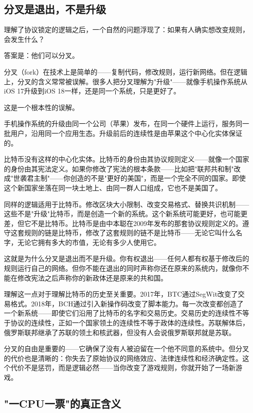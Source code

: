 \documentclass[a4paper,12pt,openany]{ctexbook}
\begin{document}
\subsection*{分叉是退出，不是升级}


理解了协议锁定的逻辑之后，一个自然的问题浮现了：如果有人确实想改变规则，会发生什么？

答案是：他们可以分叉。

分叉（fork）在技术上是简单的——复制代码，修改规则，运行新网络。但在逻辑上，分叉的含义常常被误解。很多人把分叉理解为"升级"——就像手机操作系统从iOS 17升级到iOS 18一样，还是同一个系统，只是更好了。

这是一个根本性的误解。

手机操作系统的升级由同一个公司（苹果）发布，在同一个硬件上运行，服务同一批用户，沿用同一个应用生态。升级前后的连续性是由苹果这个中心化实体保证的。

比特币没有这样的中心化实体。比特币的身份由其协议规则定义——就像一个国家的身份由其宪法定义。如果你修改了宪法的根本条款——比如把"联邦共和制"改成"世袭君主制"——你创造的不是"更好的美国"，而是一个完全不同的国家。即使这个新国家坐落在同一块土地上、由同一群人口组成，它也不是美国了。

同样的逻辑适用于比特币。修改区块大小限制、改变交易格式、替换共识机制——这些不是"升级"比特币，而是创造一个新的系统。这个新系统可能更好，也可能更差，但它不是比特币。比特币是由中本聪在2009年发布的那套协议规则定义的。遵守这套规则的链是比特币，修改了这套规则的链不是比特币——无论它叫什么名字，无论它拥有多大的市值，无论有多少人使用它。

这就是为什么分叉是退出而不是升级。你有权退出——任何人都有权基于修改后的规则运行自己的网络。但你不能在退出的同时声称你还在原来的系统内，就像你不能在修改宪法之后声称你的新政体还是原来的共和国。

理解这一点对于理解比特币的历史至关重要。2017年，BTC通过SegWit改变了交易格式。2018年，BCH通过引入新操作码改变了脚本能力。每一次改变都创造了一个新系统——即使它们沿用了比特币的名字和交易历史。交易历史的连续性不等于协议的连续性，正如一个国家领土的连续性不等于政体的连续性。苏联解体后，俄罗斯联邦继承了苏联的领土和核武器，但没有人会说俄罗斯联邦就是苏联。

分叉的自由是重要的——它确保了没有人被迫留在一个他不同意的系统中。但分叉的代价也是清晰的：你失去了原始协议的网络效应、法律连续性和经济确定性。这个代价不是惩罚，而是逻辑必然——当你改变了游戏规则，你就开始了一场新游戏。


\subsection*{"一CPU一票"的真正含义}
\end{document}
